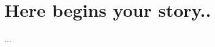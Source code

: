 \documentclass[a4paper, 12pt, oneside, times, print, NoDraft]{template/UBtemplate}
\begin{document}




\frontmatter %







\mainmatter %











\chapter{Here begins your story..}

...















\end{document}
